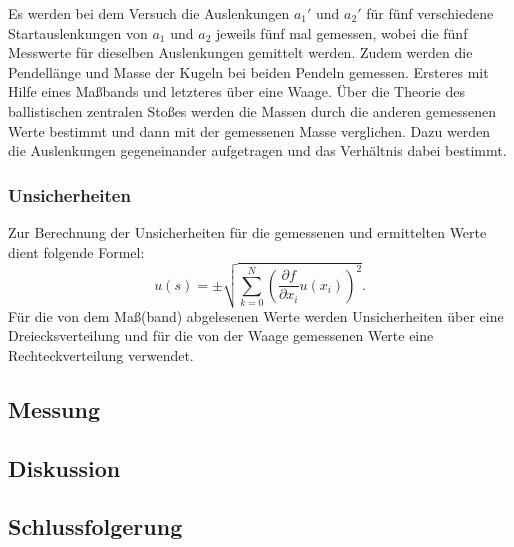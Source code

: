 		Es werden bei dem Versuch die Auslenkungen $a_1'$ und $a_2'$ für fünf verschiedene Startauslenkungen von $a_1$ und $a_2$ jeweils fünf mal gemessen, wobei die fünf Messwerte für dieselben Auslenkungen gemittelt werden.
		Zudem werden die Pendellänge und Masse der Kugeln bei beiden Pendeln gemessen. Ersteres mit Hilfe eines Maßbands und letzteres über eine Waage.	
		Über die Theorie des ballistischen zentralen Stoßes werden die Massen durch die anderen gemessenen Werte bestimmt und dann mit der gemessenen Masse verglichen. Dazu werden die Auslenkungen gegeneinander aufgetragen und das Verhältnis dabei bestimmt.
				
		\subsubsection{Unsicherheiten}
		
			Zur Berechnung der Unsicherheiten für die gemessenen und ermittelten Werte dient folgende Formel: 
			\begin{equation*}
				u(s) = \pm \sqrt{\sum_{k=0}^{N}\left( \frac{\partial f}{\partial x_i}u(x_i)\right) ^2}. \label{eq:kombUnsicherheit}
			\end{equation*}
			Für die von dem Maß(band) abgelesenen Werte werden Unsicherheiten über eine Dreiecksverteilung und für die von der Waage gemessenen Werte eine Rechteckverteilung verwendet. 
	
	\subsection{Messung}
	
	\subsection{Diskussion}
	
	\subsection{Schlussfolgerung}